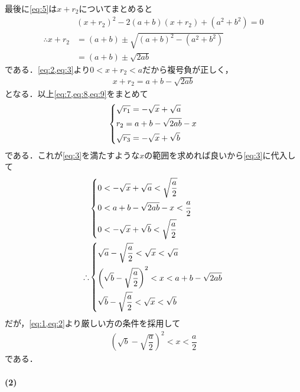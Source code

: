 \documentclass[../../main.tex]{subfiles}
\begin{document}
最後に\cref{eq:5}は$x+r_2$についてまとめると
\begin{align}
  & (x+r_2)^2 -2(a+b)(x+r_2)+\left(a^2+b^2\right) = 0 \\
  \therefore
  x+r_2 & = (a+b) \pm \sqrt{(a+b)^2-(a^2+b^2)} \\
  & = (a+b) \pm \sqrt{2ab}
\end{align}
である．\cref{eq:2,eq:3}より$0<x+r_2<a$だから複号負が正しく，
\begin{align}
  x+r_2
  = a+b-\sqrt{2ab} \label{eq:9}
\end{align}
となる．以上\cref{eq:7,eq:8,eq:9}をまとめて
\begin{align}
  \begin{dcases}
    \sqrt{r_1} = -\sqrt{x} + \sqrt{a} \\
    r_2 = a+b-\sqrt{2ab} - x \\
    \sqrt{r_3} = -\sqrt{x} + \sqrt{b}
  \end{dcases} \label{eq:10}
\end{align}
である．これが\cref{eq:3}を満たすような$x$の範囲を求めれば良いから\cref{eq:3}に代入して
\begin{align}
  &
  \begin{dcases}
    0 < -\sqrt{x} + \sqrt{a} < \sqrt{\dfrac{a}{2}} \\
    0 < a+b-\sqrt{2ab} - x < \dfrac{a}{2} \\
    0 < -\sqrt{x} + \sqrt{b} < \sqrt{\dfrac{a}{2}}
  \end{dcases} \\
  \therefore
  &
  \begin{dcases}
    \sqrt{a} - \sqrt{\dfrac{a}{2}} < \sqrt{x} <  \sqrt{a}  \\
    \left(\sqrt{b}-\sqrt{\dfrac{a}{2}}\right)^2 <  x < a+b-\sqrt{2ab} \\
    \sqrt{b} - \sqrt{\dfrac{a}{2}} < \sqrt{x} < \sqrt{b}
  \end{dcases}
\end{align}
だが，\cref{eq:1,eq:2}より厳しい方の条件を採用して
\begin{align}
  \left(\sqrt{b} - \sqrt{\dfrac{a}{2}}\right)^2 < x < \dfrac{a}{2} \label{eq:11}
\end{align}
である．

\paragraph{(2)}
\end{document}
